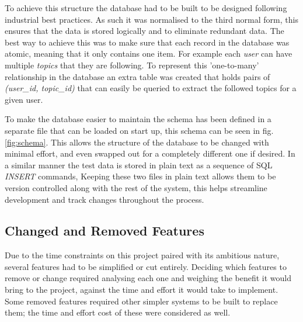 \documentclass[12pt,titlepage]{article}
\begin{document}
  To achieve this structure the database had to be built to be designed
  following industrial best practices. As such it was normalised to the third
  normal form, this ensures that the data is stored logically and to eliminate
  redundant data. The best way to achieve this was to make sure that each record
  in the database was atomic, meaning that it only contains one item. For
  example each \textit{user} can have multiple \textit{topics} that they are
  following. To represent this 'one-to-many' relationship in the database an
  extra table was created that holds pairs of \textit{(user\_id, topic\_id)}
  that can easily be queried to extract the followed topics for a given user.

  To make the database easier to maintain the schema has been defined in a
  separate file that can be loaded on start up, this schema can be seen in fig.
  \ref{fig:schema}. This allows the structure of the database to be changed with
  minimal effort, and even swapped out for a completely different one if
  desired. In a similar manner the test data is stored in plain text as a
  sequence of SQL \textit{INSERT} commands, Keeping these two files in plain
  text allows them to be version controlled along with the rest of the system,
  this helps streamline development and track changes throughout the process.

  \subsection{Changed and Removed Features}

  Due to the time constraints on this project paired with its ambitious nature,
  several features had to be simplified or cut entirely. Deciding which
  features to remove or change required analysing each one and weighing the
  benefit it would bring to the project, against the time and effort it would
  take to implement. Some removed features required other simpler systems to be
  built to replace them; the time and effort cost of these were considered
  as well.
\end{document}
